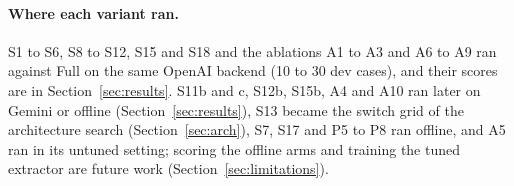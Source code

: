 \paragraph{Where each variant ran.} S1 to S6, S8 to S12, S15 and S18 and the ablations A1 to A3 and A6 to A9 ran against Full on the same OpenAI backend (10 to 30 dev cases), and their scores are in Section~\ref{sec:results}. S11b and c, S12b, S15b, A4 and A10 ran later on Gemini or offline (Section~\ref{sec:results}), S13 became the switch grid of the architecture search (Section~\ref{sec:arch}), S7, S17 and P5 to P8 ran offline, and A5 ran in its untuned setting; scoring the offline arms and training the tuned extractor are future work (Section~\ref{sec:limitations}).
